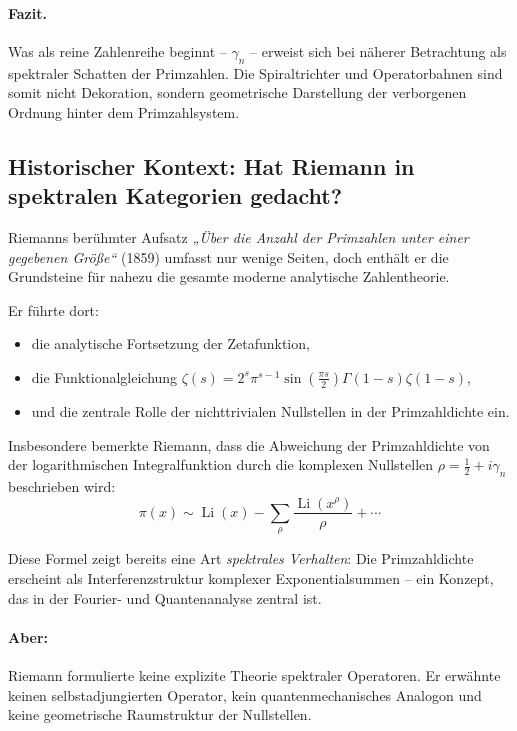\paragraph{Fazit.}
Was als reine Zahlenreihe beginnt – $\gamma_n$ – erweist sich bei näherer Betrachtung als spektraler Schatten der Primzahlen.  
Die Spiraltrichter und Operatorbahnen sind somit nicht Dekoration, sondern geometrische Darstellung der verborgenen Ordnung hinter dem Primzahlsystem.

\subsection*{Historischer Kontext: Hat Riemann in spektralen Kategorien gedacht?}

Riemanns berühmter Aufsatz \emph{„Über die Anzahl der Primzahlen unter einer gegebenen Größe“} (1859) umfasst nur wenige Seiten, doch enthält er die Grundsteine für nahezu die gesamte moderne analytische Zahlentheorie.

Er führte dort:
\begin{itemize}
    \item die analytische Fortsetzung der Zetafunktion,
    \item die Funktionalgleichung $\zeta(s) = 2^s \pi^{s-1} \sin\left(\frac{\pi s}{2}\right) \Gamma(1 - s) \zeta(1 - s)$,
    \item und die zentrale Rolle der nichttrivialen Nullstellen in der Primzahldichte ein.
\end{itemize}

Insbesondere bemerkte Riemann, dass die Abweichung der Primzahldichte von der logarithmischen Integralfunktion durch die komplexen Nullstellen $\rho = \frac{1}{2} + i\gamma_n$ beschrieben wird:
\[
\pi(x) \sim \operatorname{Li}(x) - \sum_{\rho} \frac{\operatorname{Li}(x^\rho)}{\rho} + \cdots
\]

Diese Formel zeigt bereits eine Art \emph{spektrales Verhalten}: Die Primzahldichte erscheint als Interferenzstruktur komplexer Exponentialsummen – ein Konzept, das in der Fourier- und Quantenanalyse zentral ist.

\paragraph{Aber:} Riemann formulierte keine explizite Theorie spektraler Operatoren.  
Er erwähnte keinen selbstadjungierten Operator, kein quantenmechanisches Analogon und keine geometrische Raumstruktur der Nullstellen.

